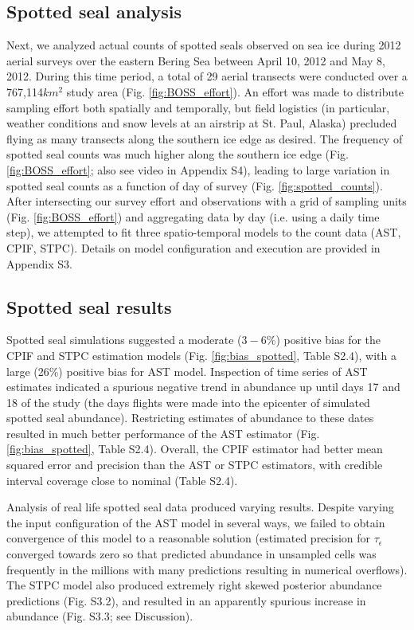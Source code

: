 \documentclass[times,mee,doublespace,]{besauth2}
\begin{document}
\subsection{Spotted seal analysis}

Next, we analyzed actual counts of spotted seals observed on sea ice during 2012 aerial surveys over the eastern Bering Sea between April 10, 2012 and May 8, 2012.  During this time period, a total of 29 aerial transects were conducted over a 767,114$km^2$ study area (Fig. \ref{fig:BOSS_effort}).  An effort was made to distribute sampling effort both spatially and temporally, but field logistics (in particular, weather conditions and snow levels at an airstrip at St. Paul, Alaska) precluded flying as many transects along the southern ice edge as desired.  The frequency of spotted seal counts was much higher along the southern ice edge (Fig. \ref{fig:BOSS_effort}; also see video in Appendix S4), leading to large variation in spotted seal counts as a function of day of survey (Fig. \ref{fig:spotted_counts}).  After intersecting our survey effort and observations with a grid of sampling units (Fig. \ref{fig:BOSS_effort}) and aggregating data by day (i.e. using a daily time step), we attempted to fit three spatio-temporal models to the count data (AST, CPIF, STPC).  Details on model configuration and execution are provided in Appendix S3.

\subsection{Spotted seal results}

Spotted seal simulations suggested a moderate ($3-6\%$) positive bias for the CPIF and STPC estimation models (Fig. \ref{fig:bias_spotted}, Table S2.4), with a large (26\%) positive bias for AST model.  Inspection of time series of AST estimates indicated a spurious negative trend in abundance up until days 17 and 18 of the study (the days flights were made into the epicenter of simulated spotted seal abundance).  Restricting estimates of abundance to these dates resulted in much better performance of the AST estimator (Fig. \ref{fig:bias_spotted}, Table S2.4).  Overall, the CPIF estimator had better mean squared error and precision than the AST or STPC estimators, with credible interval coverage close to nominal (Table S2.4).

Analysis of real life spotted seal data produced varying results.  Despite varying the input configuration of the AST model in several ways, we failed to obtain convergence of this model to a reasonable solution (estimated precision for $\tau_\epsilon$ converged towards zero so that predicted abundance in unsampled cells was frequently in the millions with many predictions resulting in numerical overflows). The STPC model also produced extremely right skewed posterior abundance predictions (Fig. S3.2), and resulted in an apparently spurious increase in abundance (Fig. S3.3; see Discussion).
\end{document}
